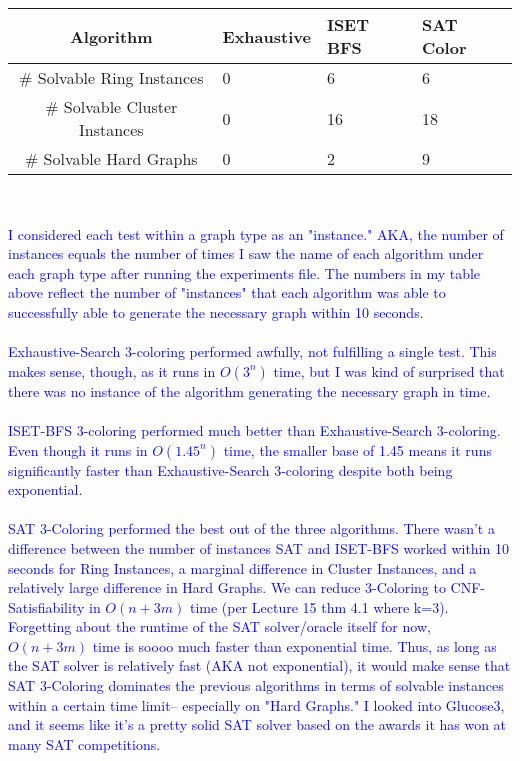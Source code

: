 \documentclass[11pt]{article}
\begin{document}
\begin{enumerate}
\begin{enumerate}
\begin{center}
    \begin{tabular}{|c|l|l|l|}
    \hline 
    Algorithm
    & \multicolumn{1}{|p{2cm}|}{Exhaustive}
    & \multicolumn{1}{|p{2cm}|}{ISET BFS}
    & \multicolumn{1}{|p{2cm}|}{SAT Color}\\\hline
    \hline
        \# Solvable Ring Instances & 0 & 6 & 6 \\
        \# Solvable Cluster Instances & 0 & 16 & 18 \\
        \# Solvable Hard Graphs  & 0 & 2 & 9 \\
        \hline 
    \end{tabular} \\
\end{center}

    \textcolor{blue}{
I considered each test within a graph type as an "instance." AKA, the number of instances equals the number of times I saw the name of each algorithm under each graph type after running the experiments file. The numbers in my table above reflect the number of "instances" that each algorithm was able to successfully able to generate the necessary graph within 10 seconds. \\ \\
Exhaustive-Search 3-coloring performed awfully, not fulfilling a single test. This makes sense, though, as it runs in $O(3^n)$ time, but I was kind of surprised that there was no instance of the algorithm generating the necessary graph in time. \\ \\
ISET-BFS 3-coloring performed much better than Exhaustive-Search 3-coloring. Even though it runs in $O(1.45^n)$ time, the smaller base of 1.45 means it runs significantly faster than Exhaustive-Search 3-coloring despite both being exponential. \\ \\
SAT 3-Coloring performed the best out of the three algorithms. There wasn't a difference between the number of instances SAT and ISET-BFS worked within 10 seconds for Ring Instances, a marginal difference in Cluster Instances, and a relatively large difference in Hard Graphs. We can reduce 3-Coloring to CNF-Satisfiability in $O(n+3m)$ time (per Lecture 15 thm 4.1 where k=3). Forgetting about the runtime of the SAT solver/oracle itself for now, $O(n+3m)$ time is soooo much faster than exponential time. Thus, as long as the SAT solver is relatively fast (AKA not exponential), it would make sense that SAT 3-Coloring dominates the previous algorithms in terms of solvable instances within a certain time limit– especially on "Hard Graphs." I looked into Glucose3, and it seems like it's a pretty solid SAT solver based on the awards it has won at many SAT competitions.
}


\end{enumerate}
\end{enumerate}
\end{document}
